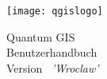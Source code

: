 
\begin{titlepage}
\begin{center}

\begin{center}
\texttt{[image: qgislogo]} 
\end{center}

\Huge{Quantum GIS}\\
\vspace{0.5cm}
\Large{Benutzerhandbuch} \\
\vspace{0.5cm}
\Large{Version ~\CURRENT \textsl{'Wroclaw'}}

\end{center}
\end{titlepage}

